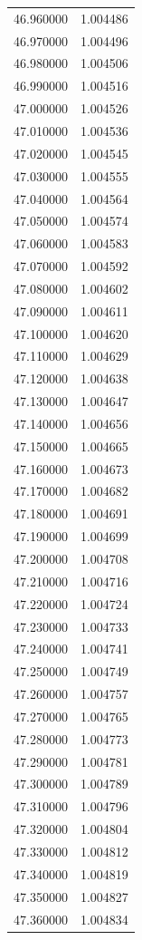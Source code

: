 \begin{tabular}{rr}
46.960000 & 1.004486 \\
46.970000 & 1.004496 \\
46.980000 & 1.004506 \\
46.990000 & 1.004516 \\
47.000000 & 1.004526 \\
47.010000 & 1.004536 \\
47.020000 & 1.004545 \\
47.030000 & 1.004555 \\
47.040000 & 1.004564 \\
47.050000 & 1.004574 \\
47.060000 & 1.004583 \\
47.070000 & 1.004592 \\
47.080000 & 1.004602 \\
47.090000 & 1.004611 \\
47.100000 & 1.004620 \\
47.110000 & 1.004629 \\
47.120000 & 1.004638 \\
47.130000 & 1.004647 \\
47.140000 & 1.004656 \\
47.150000 & 1.004665 \\
47.160000 & 1.004673 \\
47.170000 & 1.004682 \\
47.180000 & 1.004691 \\
47.190000 & 1.004699 \\
47.200000 & 1.004708 \\
47.210000 & 1.004716 \\
47.220000 & 1.004724 \\
47.230000 & 1.004733 \\
47.240000 & 1.004741 \\
47.250000 & 1.004749 \\
47.260000 & 1.004757 \\
47.270000 & 1.004765 \\
47.280000 & 1.004773 \\
47.290000 & 1.004781 \\
47.300000 & 1.004789 \\
47.310000 & 1.004796 \\
47.320000 & 1.004804 \\
47.330000 & 1.004812 \\
47.340000 & 1.004819 \\
47.350000 & 1.004827 \\
47.360000 & 1.004834 \\

\end{tabular}
